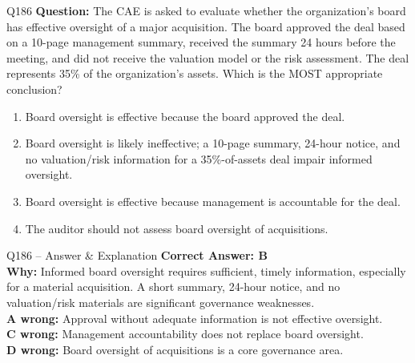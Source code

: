 \documentclass[aspectratio=169,10pt]{beamer}
\begin{document}
	\begin{frame}[t]{Q186}
		\small
		\textbf{Question:} The CAE is asked to evaluate whether the organization's board has effective oversight of a major acquisition. The board approved the deal based on a 10-page management summary, received the summary 24 hours before the meeting, and did not receive the valuation model or the risk assessment. The deal represents 35\% of the organization's assets. Which is the MOST appropriate conclusion?
		\begin{enumerate}[label=\Alph*.,itemsep=1pt,topsep=2pt]
			\item Board oversight is effective because the board approved the deal.
			\item Board oversight is likely ineffective; a 10-page summary, 24-hour notice, and no valuation/risk information for a 35\%-of-assets deal impair informed oversight.
			\item Board oversight is effective because management is accountable for the deal.
			\item The auditor should not assess board oversight of acquisitions.
		\end{enumerate}
	\end{frame}
	
	\begin{frame}[t]{Q186 -- Answer \& Explanation}
		\small
		\textbf{Correct Answer: B} \\[4pt]
		\textbf{Why:} Informed board oversight requires sufficient, timely information, especially for a material acquisition. A short summary, 24-hour notice, and no valuation/risk materials are significant governance weaknesses. \\[4pt]
		\textbf{A wrong:} Approval without adequate information is not effective oversight. \\[2pt]
		\textbf{C wrong:} Management accountability does not replace board oversight. \\[2pt]
		\textbf{D wrong:} Board oversight of acquisitions is a core governance area.
	\end{frame}
	
\end{document}
